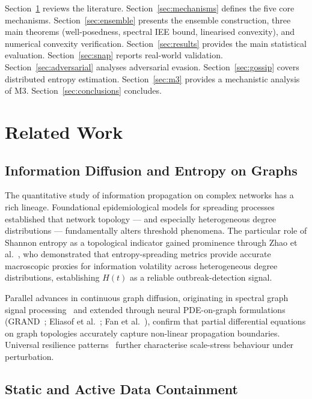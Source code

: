 \documentclass[review,12pt]{elsarticle}
\begin{document}
Section~\ref{sec:related} reviews the literature. Section~\ref{sec:mechanisms}
defines the five core mechanisms. Section~\ref{sec:ensemble} presents the
ensemble construction, three main theorems (well-posedness, spectral IEE bound,
linearised convexity), and numerical convexity verification. Section~\ref{sec:results} provides the main statistical evaluation.
Section~\ref{sec:snap} reports real-world validation. Section~\ref{sec:adversarial}
analyses adversarial evasion. Section~\ref{sec:gossip} covers distributed entropy
estimation. Section~\ref{sec:m3} provides a mechanistic analysis of M3. Section~\ref{sec:conclusions}
concludes.

\section{Related Work}
\label{sec:related}

\subsection{Information Diffusion and Entropy on Graphs}

The quantitative study of information propagation on complex networks has a
rich lineage. Foundational epidemiological models for spreading
processes~\cite{pastor2015epidemic} established that network topology --- and
especially heterogeneous degree distributions --- fundamentally alters
threshold phenomena. The particular role of Shannon entropy as a topological
indicator gained prominence through Zhao et al.~\cite{zhao2024multi}, who
demonstrated that entropy-spreading metrics provide accurate macroscopic proxies
for information volatility across heterogeneous degree distributions, establishing
$H(t)$ as a reliable outbreak-detection signal.

Parallel advances in continuous graph diffusion, originating in spectral graph
signal processing~\cite{shuman2013emerging} and extended through neural
PDE-on-graph formulations (GRAND~\cite{chamberlain2021grand};
Eliasof et al.~\cite{eliasof2024graph}; Fan et al.~\cite{fan2024graph}), confirm
that partial differential equations on graph topologies accurately capture
non-linear propagation boundaries. Universal resilience patterns~\cite{gao2016universal}
further characterise scale-stress behaviour under perturbation.

\subsection{Static and Active Data Containment}
\end{document}
